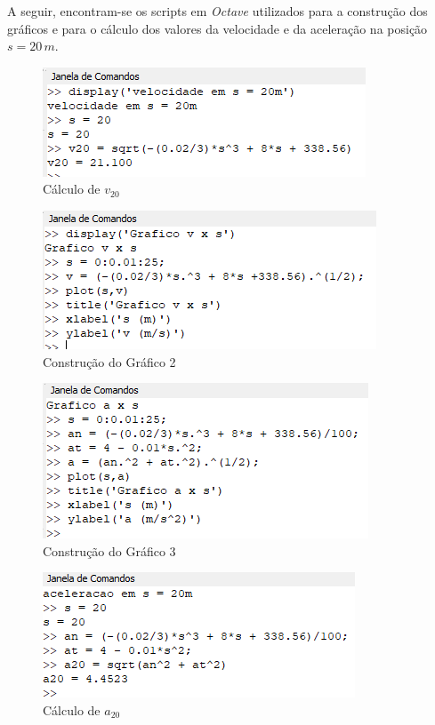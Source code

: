\documentclass[a4paper, 12pt]{article}
\begin{document}
	A seguir, encontram-se os scripts em \textit{Octave} utilizados para a construção dos gráficos e para o cálculo dos 
	valores da velocidade e da aceleração na posição $s=20\,m$.
	
	\begin{figure}[H]
		\centering
		\includegraphics[scale=1]{img1.png}
		\caption{Cálculo de $v_{20}$}
	\end{figure}
	
	\begin{figure}[H]
		\centering
		\includegraphics[scale=1]{img2.png}
		\caption{Construção do Gráfico 2}
	\end{figure}
	
	\begin{figure}[H]
		\centering
		\includegraphics[scale=1]{img3.png}
		\caption{Construção do Gráfico 3}
	\end{figure}
	
	\begin{figure}[H]
		\centering
		\includegraphics[scale=1]{img4.png}
		\caption{Cálculo de $a_{20}$}
	\end{figure}
	
\end{document}
